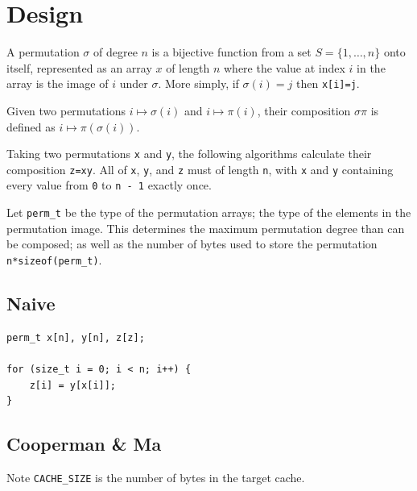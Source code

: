 \documentclass{article}
\begin{document}
\section{Design}

A permutation $\sigma$ of degree $n$ is a bijective function from a set $S=\{1, \ldots, n\}$ onto itself, represented as an array $x$ of length $n$ where the value at index $i$ in the array is the image of $i$ under $\sigma$. More simply, if $\sigma(i)=j$ then \texttt{x[i]=j}.

Given two permutations $i\mapsto \sigma(i)$ and $i\mapsto \pi(i)$, their composition $\sigma\pi$ is defined as $i\mapsto \pi(\sigma(i))$.

Taking two permutations \texttt{x} and \texttt{y}, the following algorithms calculate their composition \texttt{z=xy}. All of \texttt{x}, \texttt{y}, and \texttt{z} must of length \texttt{n}, with \texttt{x} and \texttt{y} containing every value from \texttt{0} to \texttt{n - 1} exactly once.

Let \verb|perm_t| be the type of the permutation arrays; the type of the elements in the permutation image. This determines the maximum permutation degree than can be composed; as well as the number of bytes used to store the permutation \texttt{n*sizeof(perm\_t)}.


\subsection{Naive}

\begin{lstlisting}[style=CStyle, caption={Naive Algorithm}]
perm_t x[n], y[n], z[z];

for (size_t i = 0; i < n; i++) {
	z[i] = y[x[i]];
}
\end{lstlisting}

\subsection{Cooperman \& Ma}

Note \texttt{CACHE\_SIZE} is the number of bytes in the target cache.
\end{document}
